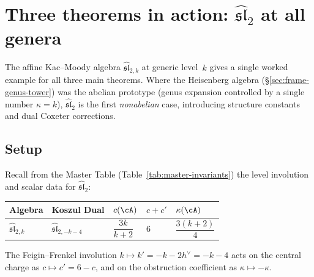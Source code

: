 \section{\texorpdfstring{Three theorems in action: $\widehat{\mathfrak{sl}}_2$ at all genera}{Three theorems in action: affine sl2 at all genera}}\label{sec:three-theorems-sl2}

The affine Kac--Moody algebra $\widehat{\mathfrak{sl}}_{2,k}$ at
generic level~$k$ gives a single worked example for all three main
theorems. Where the Heisenberg algebra
(\S\ref{sec:frame-genus-tower}) was the abelian prototype (genus
expansion controlled by a single number $\kappa = k$),
$\widehat{\mathfrak{sl}}_2$ is the first \emph{nonabelian} case,
introducing structure constants and dual Coxeter corrections.

\subsection{Setup}\label{subsec:sl2-genus-setup}

Recall from the Master Table (Table~\ref{tab:master-invariants}) the
level involution and scalar data for $\widehat{\mathfrak{sl}}_2$:
\begin{center}
\renewcommand{\arraystretch}{1.4}
\begin{tabular}{lllll}
\toprule
Algebra & Koszul Dual & $c(\cA)$ & $c + c'$ & $\kappa(\cA)$ \\
\midrule
$\widehat{\mathfrak{sl}}_{2,k}$ & $\widehat{\mathfrak{sl}}_{2,-k-4}$ & $\dfrac{3k}{k+2}$ & $6$ & $\dfrac{3(k+2)}{4}$ \\[6pt]
\bottomrule
\end{tabular}
\end{center}
The Feigin--Frenkel involution $k \mapsto k' = -k - 2h^\vee = -k-4$ acts on the central charge as $c \mapsto c' = 6 - c$, and on the obstruction coefficient as $\kappa \mapsto -\kappa$.

